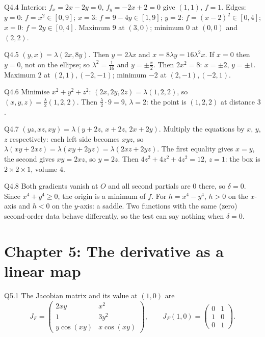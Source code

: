 \begin{solution}{Q4.4}
Interior: $f_x=2x-2y=0$, $f_y=-2x+2=0$ give $(1,1)$, $f=1$. Edges:
$y=0$: $f=x^2\in[0,9]$; $x=3$: $f=9-4y\in[1,9]$; $y=2$: $f=(x-2)^2\in[0,4]$; $x=0$: $f=2y\in[0,4]$.
Maximum $9$ at $(3,0)$; minimum $0$ at $(0,0)$ and $(2,2)$.
\end{solution}

\begin{solution}{Q4.5}
$(y,x)=\lambda(2x,8y)$. Then $y=2\lambda x$ and $x=8\lambda y=16\lambda^2x$. If $x=0$ then $y=0$, not on the
ellipse; so $\lambda^2=\frac1{16}$ and $y=\pm\frac x2$. Then $2x^2=8$: $x=\pm2$, $y=\pm1$. Maximum $2$ at
$(2,1),(-2,-1)$; minimum $-2$ at $(2,-1),(-2,1)$.
\end{solution}

\begin{solution}{Q4.6}
Minimise $x^2+y^2+z^2$: $(2x,2y,2z)=\lambda(1,2,2)$, so $(x,y,z)=\frac\lambda2(1,2,2)$. Then
$\frac\lambda2\cdot9=9$, $\lambda=2$: the point is $(1,2,2)$ at distance $3$.
\end{solution}

\begin{solution}{Q4.7}
$(yz,xz,xy)=\lambda(y+2z,\,x+2z,\,2x+2y)$. Multiply the equations by $x$, $y$, $z$ respectively: each
left side becomes $xyz$, so $\lambda(xy+2xz)=\lambda(xy+2yz)=\lambda(2xz+2yz)$. The first equality gives
$x=y$, the second gives $xy=2xz$, so $y=2z$. Then $4z^2+4z^2+4z^2=12$, $z=1$: the box is
$2\times2\times1$, volume $4$.
\end{solution}

\begin{solution}{Q4.8}
Both gradients vanish at $O$ and all second partials are $0$ there, so $\delta=0$. Since $x^4+y^4\ge0$,
the origin is a minimum of $f$. For $h=x^4-y^4$, $h>0$ on the $x$-axis and $h<0$ on the $y$-axis:
a saddle. Two functions with the same (zero) second-order data behave differently, so the test
can say nothing when $\delta=0$.
\end{solution}

\section{Chapter 5: The derivative as a linear map}

\begin{solution}{Q5.1}
The Jacobian matrix and its value at $(1,0)$ are
\[ J_F=\begin{pmatrix}2xy&x^2\\1&3y^2\\y\cos(xy)&x\cos(xy)\end{pmatrix},\qquad J_F(1,0)=\begin{pmatrix}0&1\\1&0\\0&1\end{pmatrix}. \]
\end{solution}

